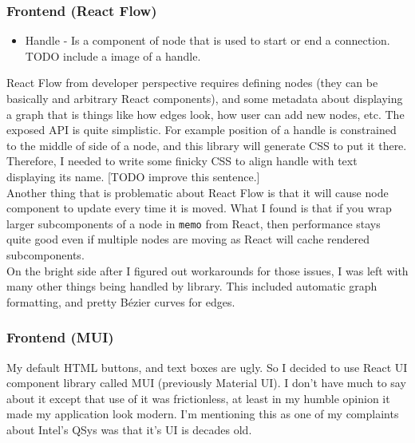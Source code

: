 \documentclass[14pt]{report}
\begin{document}
\subsubsection{Frontend (React Flow)}
\begin{tcolorbox}[title=Vocabulary]
    \begin{itemize}
        \item Handle - Is a component of node that is used to start or end a connection. TODO include a image of a handle.
    \end{itemize}
\end{tcolorbox}
React Flow from developer perspective requires defining nodes (they can be basically and arbitrary React components), and some metadata about displaying a graph that is things like how edges look, how user can add new nodes, etc. 
The exposed API is quite simplistic. 
For example position of a handle is constrained to the middle of side of a node, and this library will generate CSS to put it there. 
Therefore, I needed to write some finicky CSS to align handle with text displaying its name. [TODO improve this sentence.]
\\
Another thing that is problematic about React Flow is that it will cause node component to update every time it is moved. 
What I found is that if you wrap larger subcomponents of a node in \verb!memo! from React, then performance stays quite good even if multiple nodes are moving as React will cache rendered subcomponents.  
\\
On the bright side after I figured out workarounds for those issues, I was left with many other things being handled by library. This included automatic graph formatting, and pretty Bézier curves for edges. 

\subsubsection{Frontend (MUI)}
My default HTML buttons, and text boxes are ugly. So I decided to use React UI component library called MUI (previously Material UI). I don't have much to say about it except that use of it was frictionless, at least in my humble opinion it made my application look modern. I'm mentioning this as one of my complaints about Intel's QSys was that it's UI is decades old.
\end{document}
